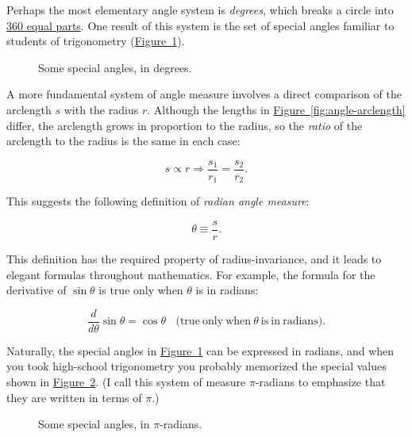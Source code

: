 \documentclass{article}
\begin{document}
Perhaps the most elementary angle system is \emph{degrees}, which breaks a circle into \href{http://www.wonderquest.com/circle.htm}{360 equal parts}. One result of this system is the set of special angles familiar to students of trigonometry (\hyperref[fig:degree-angles]{Figure~}\ref{fig:degree-angles}). 

\begin{figure}
\begin{center}
\end{center}
\caption{Some special angles, in degrees.\label{fig:degree-angles}}
\end{figure}

A more fundamental system of angle measure involves a direct comparison of the arclength $s$ with the radius $r$. Although the lengths in \hyperref[fig:angle-arclength]{Figure~}\ref{fig:angle-arclength} differ, the arclength grows in proportion to the radius, so the \emph{ratio} of the arclength to the radius is the same in each case:

\[
s\propto r \Rightarrow \frac{s_1}{r_1} = \frac{s_2}{r_2}.
\]

\noindent This suggests the following definition of \emph{radian angle measure}:

\[ \theta \equiv \frac{s}{r}. \]

\noindent This definition has the required property of radius-invariance, and it leads to elegant formulas throughout mathematics. For example, the formula for the derivative of $\sin\theta$ is true only when $\theta$ is in radians:

\[
  \frac{d}{d\theta}\sin\theta = \cos\theta \mathrm{\ \ \ \ (true\ only\ when\ } \theta\mathrm{\ is\ in\ radians).}
\]

Naturally, the special angles in \hyperref[fig:degree-angles]{Figure~}\ref{fig:degree-angles} can be expressed in radians, and when you took high-school trigonometry you probably memorized the special values shown in \hyperref[fig:pi-angles]{Figure~}\ref{fig:pi-angles}. (I call this system of measure $\pi$-radians to emphasize that they are written in terms of $\pi$.)

\begin{figure}
\begin{center}
\end{center}
\caption{Some special angles, in $\pi$-radians.\label{fig:pi-angles}}
\end{figure}
\end{document}
